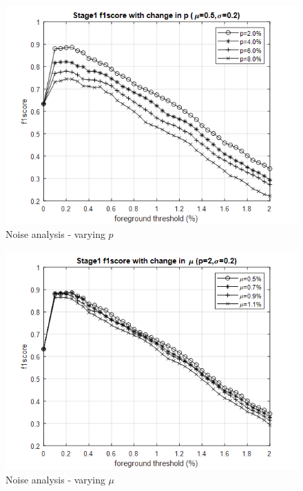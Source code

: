 \begin{figure}[ht]
    \centering
    \includegraphics[width=\linewidth]{images/noise-analysis-mog-p.png}
    \caption{Noise analysis - varying $p$}
    \label{fig:noise-analysis-mog-p}
\end{figure}

\begin{figure}[ht]
    \centering
    \includegraphics[width=\linewidth]{images/noise-analysis-mog-mu.png}
    \caption{Noise analysis - varying $\mu$}
    \label{fig:noise-analysis-mog-mu}
\end{figure}